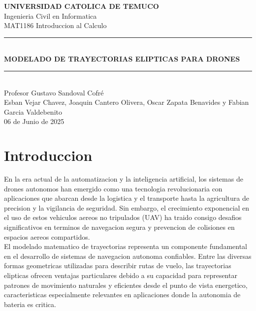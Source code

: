 \documentclass[12pt,a4paper]{article}
\begin{document}
\begin{titlepage}
    \centering
    \vspace*{2cm}
    
    {\LARGE\textbf{UNIVERSIDAD CATOLICA DE TEMUCO}}\\[0.5cm]
    {\large Ingenieria Civil en Informatica}\\[2cm]
    {\large MAT1186 Introduccion al Calculo}\\[2cm]
    
    \rule{\linewidth}{0.2mm} \\[0.4cm]
    {\huge\bfseries MODELADO DE TRAYECTORIAS ELIPTICAS PARA DRONES}\\[0.2cm]
    \rule{\linewidth}{0.2mm} \\[1.5cm]

    {\large Profesor Gustavo Sandoval Cofré}\\[0.5cm]
    {\large Esban Vejar Chavez, Joaquin Cantero Olivera, Oscar Zapata Benavides y Fabian Garcia Valdebenito}\\[0.5cm]

    {\large 06 de Junio de 2025}\\
    
    \vfill
\end{titlepage}

\tableofcontents
\newpage

\section{Introduccion}

En la era actual de la automatizacion y la inteligencia artificial, los sistemas de drones autonomos han emergido como una tecnologia revolucionaria con aplicaciones que abarcan desde la logistica y el transporte hasta la agricultura de precision y la vigilancia de seguridad. Sin embargo, el crecimiento exponencial en el uso de estos vehiculos aereos no tripulados (UAV) ha traido consigo desafios significativos en terminos de navegacion segura y prevencion de colisiones en espacios aereos compartidos.\\

El modelado matematico de trayectorias representa un componente fundamental en el desarrollo de sistemas de navegacion autonoma confiables. Entre las diversas formas geometricas utilizadas para describir rutas de vuelo, las trayectorias elipticas ofrecen ventajas particulares debido a su capacidad para representar patrones de movimiento naturales y eficientes desde el punto de vista energetico, caracteristicas especialmente relevantes en aplicaciones donde la autonomia de bateria es critica.
\end{document}
